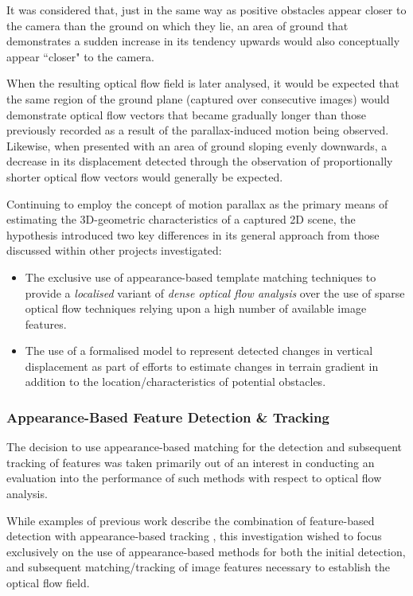 It was considered that, just in the same way as positive obstacles appear closer to the camera than the ground on which they lie, an area of ground that demonstrates a sudden increase in its tendency upwards would also conceptually appear ``closer" to the camera. 

When the resulting optical flow field is later analysed, it would be expected that the same region of the ground plane (captured over consecutive images) would demonstrate optical flow vectors that became gradually longer than those previously recorded as a result of the parallax-induced motion being observed. Likewise, when presented with an area of ground sloping evenly downwards, a decrease in its displacement detected through the observation of proportionally shorter optical flow vectors would generally be expected.  

Continuing to employ the concept of motion parallax as the primary means of estimating the 3D-geometric characteristics of a captured 2D scene, the hypothesis introduced two key differences in its general approach from those discussed within other projects investigated:

\begin{itemize}
	\item The exclusive use of appearance-based template matching techniques to provide a \textit{localised} variant of \textit{dense optical flow analysis} over the use of sparse optical flow techniques relying upon a high number of available image features.
	\item The use of a formalised model to represent detected changes in vertical displacement as part of efforts to estimate changes in terrain gradient in addition to the location/characteristics of potential obstacles. 
\end{itemize}

\subsubsection{Appearance-Based Feature Detection \& Tracking}
\label{hypo-tracking}

The decision to use appearance-based matching for the detection and subsequent tracking of features was taken primarily out of an interest in conducting an evaluation into the performance of such methods with respect to optical flow analysis. 

While examples of previous work describe the combination of feature-based detection with appearance-based tracking \cite{wyeth}, this investigation wished to focus exclusively on the use of appearance-based methods for both the initial detection, and subsequent matching/tracking of image features necessary to establish the optical flow field.

